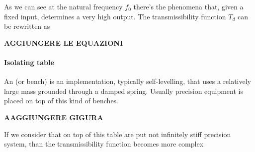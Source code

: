 	As we can see at the natural frequency $f_0$ there's the  phenomena that, given a fixed input, determines a very high output. The transmissibility function $T_d$ can be rewritten as
	
	\textbf{AGGIUNGERE LE EQUAZIONI}
	
	
	\paragraph{Isolating table} An  (or bench) is an implementation, typically self-levelling, that uses a relatively large mass grounded through a damped spring. Usually precision equipment is placed on top of this kind of benches.
		
	\textbf{AAGGIUNGERE GIGURA}
	
	If we consider that on top of this table are put not infinitely stiff precision system, than the transmissibility function becomes more complex
	
	
	
	
	
	
	
	
	
	
	
	
	
	
	
	
	
	